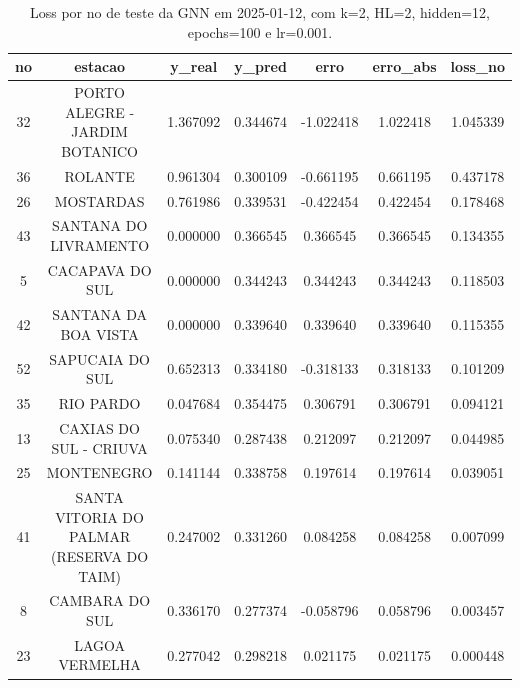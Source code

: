 \begin{table}[h]
\centering
\caption{Loss por no de teste da GNN em 2025-01-12, com k=2, HL=2, hidden=12, epochs=100 e lr=0.001.}
\label{tab:gnn_loss_k2_hl2_h12_e100_d20250112}
\begin{tabular}{ccccccc}
\toprule
no & estacao & y\_real & y\_pred & erro & erro\_abs & loss\_no \\
\midrule
32 & PORTO ALEGRE - JARDIM BOTANICO & 1.367092 & 0.344674 & -1.022418 & 1.022418 & 1.045339 \\
36 & ROLANTE & 0.961304 & 0.300109 & -0.661195 & 0.661195 & 0.437178 \\
26 & MOSTARDAS & 0.761986 & 0.339531 & -0.422454 & 0.422454 & 0.178468 \\
43 & SANTANA DO LIVRAMENTO & 0.000000 & 0.366545 & 0.366545 & 0.366545 & 0.134355 \\
5 & CACAPAVA DO SUL & 0.000000 & 0.344243 & 0.344243 & 0.344243 & 0.118503 \\
42 & SANTANA DA BOA VISTA & 0.000000 & 0.339640 & 0.339640 & 0.339640 & 0.115355 \\
52 & SAPUCAIA DO SUL & 0.652313 & 0.334180 & -0.318133 & 0.318133 & 0.101209 \\
35 & RIO PARDO & 0.047684 & 0.354475 & 0.306791 & 0.306791 & 0.094121 \\
13 & CAXIAS DO SUL - CRIUVA & 0.075340 & 0.287438 & 0.212097 & 0.212097 & 0.044985 \\
25 & MONTENEGRO & 0.141144 & 0.338758 & 0.197614 & 0.197614 & 0.039051 \\
41 & SANTA VITORIA DO PALMAR (RESERVA DO TAIM) & 0.247002 & 0.331260 & 0.084258 & 0.084258 & 0.007099 \\
8 & CAMBARA DO SUL & 0.336170 & 0.277374 & -0.058796 & 0.058796 & 0.003457 \\
23 & LAGOA VERMELHA & 0.277042 & 0.298218 & 0.021175 & 0.021175 & 0.000448 \\
\bottomrule
\end{tabular}
\end{table}
